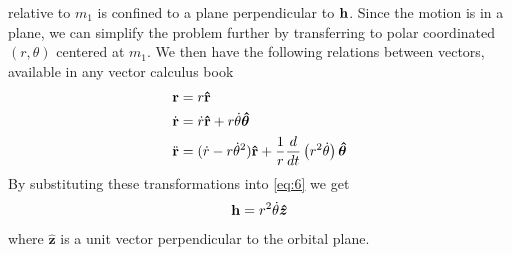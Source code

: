 \documentclass[twoside,openright,titlepage,numbers=noenddot,headinclude,%
                footinclude=true,cleardoublepage=empty,abstractoff, 
                BCOR=5mm,paper=a4,fontsize=11pt,%
                american,%
                ]{scrreprt}%
\begin{document}
relative to $m_1$ is confined to a plane perpendicular to $\boldsymbol{\mathbf{h}}$. Since 
the motion is in a plane, we can simplify the problem further by transferring 
to polar coordinated $(r,\theta)$ centered at $m_1$. We then have the following
relations between vectors, available in any vector calculus book
\begin{align}
\boldsymbol{\mathbf{r}} &=r\boldsymbol{\mathbf{\hat{r}}}\\
    \dot{\boldsymbol{\mathbf{r}}} &= \dot{r}\boldsymbol{\mathbf{\hat{r}}} + r\dot{\theta}\boldsymbol{\hat\theta}\\
    \ddot{\boldsymbol{\mathbf{r}}} &= (\dot{r} - r\dot{\theta}^2)\boldsymbol{\mathbf{\hat{r}}} + \frac{1}{r} 
    \frac{d}{dt}\left(r^2\dot{\theta}\right)\boldsymbol{\hat\theta}\label{eq:9}
\end{align}
By substituting these transformations into \cref{eq:6} we get
\begin{equation}
\boldsymbol{\mathbf{h}}=r^2\dot{\theta}\boldsymbol{\hat z}
    \label{eq:10}
\end{equation}
where $\boldsymbol{\hat z}$ is a unit vector perpendicular to the orbital plane. 
\end{document}
